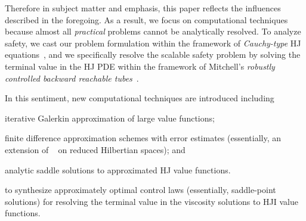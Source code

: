 Therefore in subject matter and emphasis, this paper reflects the influences described in the foregoing. As a result, we focus on computational techniques because almost all \textit{practical} problems cannot be analytically resolved. To analyze safety, we cast our problem formulation within the framework of \textit{Cauchy-type} HJ equations~\cite{Crandall1983viscosity}, and we specifically resolve the scalable safety problem by solving the terminal value in the HJ PDE within the framework of Mitchell's \textit{robustly controlled backward reachable tubes}~\cite{Mitchell2020}. %

In this sentiment, new computational techniques are introduced including
%
\begin{inparaenum}[(i)]
	\item iterative Galerkin approximation of large value functions;
	\item finite difference approximation schemes with error estimates (essentially, an extension of ~\cite{Crandall1984} on reduced Hilbertian spaces); and
	\item  analytic saddle solutions to approximated HJ value functions.
\end{inparaenum} 
%
to synthesize approximately optimal control laws (essentially, saddle-point solutions)  for resolving the terminal value in the viscosity solutions to HJI value functions.


